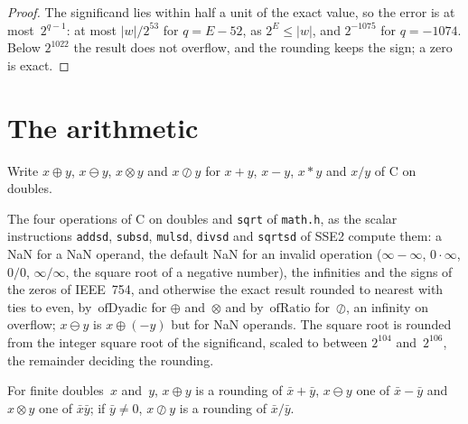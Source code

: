 \begin{proof}
  \leanok
  The significand lies within half a unit of the exact value, so the error is at most~$2^{q - 1}$:
  at most $|w|/2^{53}$ for $q = E - 52$, as $2^E \le |w|$, and $2^{-1075}$ for $q = -1074$. Below
  $2^{1022}$ the result does not overflow, and the rounding keeps the sign; a zero is exact.
\end{proof}

\section{The arithmetic}\label{sec:doubleArith}

Write $x \oplus y$, $x \ominus y$, $x \otimes y$ and $x \oslash y$ for $x + y$, $x - y$, $x * y$ and
$x / y$ of C on doubles.

\begin{definition}\label{def:Double.add}
  \leanok
  The four operations of C on doubles and \texttt{sqrt} of \texttt{math.h}, as the scalar
  instructions \texttt{addsd}, \texttt{subsd}, \texttt{mulsd}, \texttt{divsd} and \texttt{sqrtsd}
  of SSE2 compute them: a NaN for a NaN operand, the default NaN for an invalid operation
  ($\infty - \infty$, $0 \cdot \infty$, $0/0$, $\infty/\infty$, the square root of a negative
  number), the infinities and the signs of the zeros of IEEE~754, and otherwise the exact result
  rounded to nearest with ties to even, by~$\mathrm{ofDyadic}$ for $\oplus$ and~$\otimes$ and
  by~$\mathrm{ofRatio}$ for~$\oslash$, an infinity on overflow; $x \ominus y$ is
  $x \oplus (-y)$ but for NaN operands. The square root is rounded from the integer square root of
  the significand, scaled to between $2^{104}$ and~$2^{106}$, the remainder deciding the rounding.
\end{definition}


\begin{lemma}\label{lem:Double.isRounding_add}
  \leanok
  For finite doubles~$x$ and~$y$, $x \oplus y$ is a rounding of $\bar x + \bar y$, $x \ominus y$ one
  of $\bar x - \bar y$ and $x \otimes y$ one of $\bar x \bar y$; if $\bar y \ne 0$, $x \oslash y$ is
  a rounding of $\bar x / \bar y$.
\end{lemma}

